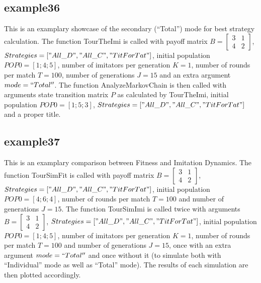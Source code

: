 \subsection{example36}
This is an examplary showcase of the secondary (``Total'') mode for best strategy calculation. The function TourTheImi is called with payoff matrix $B = \begin{bmatrix} 3 & 1 \\ 4 & 2 \end{bmatrix}$, $Strategies = ["All\_D", "All\_C", "TitForTat"]$, initial population $POP0 = [1; 4; 5]$, number of imitators per generation $K=1$, number of rounds per match $T = 100$, number of generations $J = 15$ and an extra argument $mode = ``Total''$. The function AnalyzeMarkovChain is then called with arguments state transition matrix $P$ as calculated by TourTheImi, initial population $POP0 = [1; 5; 3]$, $Strategies = ["All\_D", "All\_C", "TitForTat"]$ and a proper title.

\subsection{example37}
This is an examplary comparison between Fitness and Imitation Dynamics. The function TourSimFit is called with payoff matrix $B = \begin{bmatrix} 3 & 1 \\ 4 & 2 \end{bmatrix}$, $Strategies = ["All\_D", "All\_C", "TitForTat"]$, initial population $POP0 = [4; 6; 4]$, number of rounds per match $T = 100$ and number of generations $J = 15$. The function TourSimImi is called twice with arguments $B = \begin{bmatrix} 3 & 1 \\ 4 & 2 \end{bmatrix}$, $Strategies = ["All\_D", "All\_C", "TitForTat"]$, initial population $POP0 = [1; 4; 5]$, number of imitators per generation $K=1$, number of rounds per match $T = 100$ and number of generations $J = 15$, once with an extra argument $mode = ``Total''$ and once without it (to simulate both with ``Individual'' mode as well as ``Total'' mode). The results of each simulation are then plotted accordingly.


